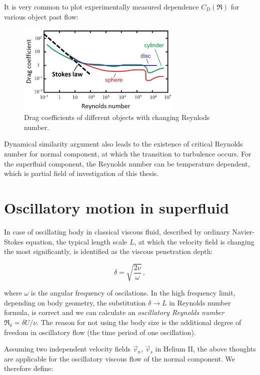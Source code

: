 It is very common to plot experimentally measured dependence $C_D(\Re)$ for various object past flow:

\begin{figure}[h]
	\centering
	\includegraphics[width=0.7\textwidth]{graphics/theory/C-Re}
	\caption{Drag coefficients of different objects with changing Reynlods number.}
	\label{C-Re}
\end{figure}

Dynamical similarity argument also leads to the existence of critical Reynolds number for normal component, at which the transition to turbulence occurs. For the superfluid component, the Reynolds number can be temperature dependent, which is partial field of investigation of this thesis.


\section{Oscillatory motion in superfluid}

In case of oscillating body in classical viscous fluid, described by ordinary Navier-Stokes equation, the typical length scale $L$, at which the velocity field is changing the most significantly, is identified as the viscous penetration depth:

\begin{equation}
\delta = \sqrt{\frac{2\nu}{\omega}}\,,
\label{penetration}
\end{equation}

where $\omega$ is the angular frequency of oscilations. In the high frequency limit, depending on
body geometry, the substitution $\delta \rightarrow L$ in Reynolds number formula, is correct and
we can calculate an \textit{oscillatory Reynolds number} $\Re_{\delta} = \delta U / \nu$. The reason
for not using the body size is the additional degree of freedom in oscillatory flow (the time
period of one oscillation).

Assuming two independent velocity fields $\vec{v}_n$, $\vec{v}_s$ in Helium II, the above thoughts are applicable for the oscillatory viscous flow of the normal component. We therefore define:

